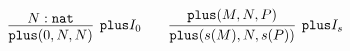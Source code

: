 \documentclass[crop]{standalone} %
\begin{document}
$\displaystyle
\infer[\texttt{plus} I_0]{
    \texttt{plus}(0, N, N)
}{
    N : \texttt{nat}
}
\qquad
\infer[\texttt{plus} I_s]{
    \texttt{plus}(s(M), N, s(P))
}{
    \texttt{plus}(M, N, P)
}
$
\end{document}
